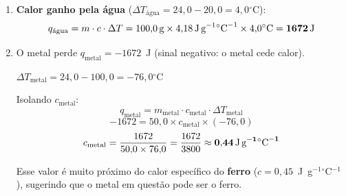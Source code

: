 \documentclass[10pt,a4paper]{article}
\newcommand{\oC}{$^\circ$C}
\begin{document}
\begin{enumerate}
  \item \textbf{Calor ganho pela água} ($\Delta T_{\text{água}} =
        24{,}0 - 20{,}0 = 4{,}0$\oC):
        \[
          q_{\text{água}}
          = m \cdot c \cdot \Delta T
          = 100{,}0\,\text{g}
            \times 4{,}18\,\text{J\,g}^{-1}\text{\oC}^{-1}
            \times 4{,}0\text{\oC}
          = \mathbf{1672\,\text{J}}
        \]

  \item O metal perde $q_{\text{metal}} = -1672$~J (sinal negativo:
        o metal cede calor).

        $\Delta T_{\text{metal}} = 24{,}0 - 100{,}0 = -76{,}0$\oC

        Isolando $c_{\text{metal}}$:
        \[
          q_{\text{metal}}
            = m_{\text{metal}} \cdot c_{\text{metal}} \cdot \Delta T_{\text{metal}}
        \]
        \[
          -1672
            = 50{,}0 \times c_{\text{metal}} \times (-76{,}0)
        \]
        \[
          c_{\text{metal}}
            = \frac{1672}{50{,}0 \times 76{,}0}
            = \frac{1672}{3800}
            \approx \mathbf{0{,}44\,\text{J\,g}^{-1}\text{\oC}^{-1}}
        \]

        Esse valor é muito próximo do calor específico do \textbf{ferro}
        ($c = 0{,}45$~J~g$^{-1}$\oC$^{-1}$), sugerindo que o metal em
        questão pode ser o ferro.
\end{enumerate}
\end{document}

